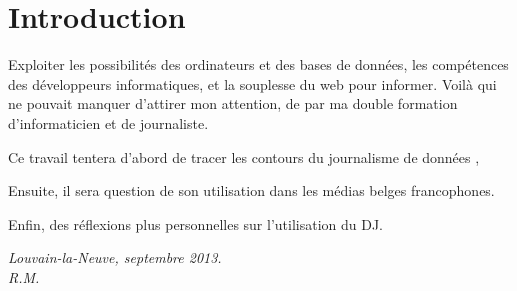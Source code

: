 
\chapter*{Introduction}

Exploiter les possibilités des ordinateurs et des bases de données, les compétences des développeurs informatiques,
et la souplesse du web pour informer. Voilà qui ne pouvait manquer d'attirer mon attention, de par ma double formation d'informaticien et de journaliste.

Ce travail tentera d'abord de tracer les contours du  \og journalisme de données \fg, 

Ensuite, il sera question de son utilisation dans les médias belges francophones.

Enfin, des réflexions plus personnelles sur l'utilisation du DJ.




\begin{flushright}
\em
Louvain-la-Neuve, septembre 2013. 
\\ R.M.
\em
\end{flushright}
